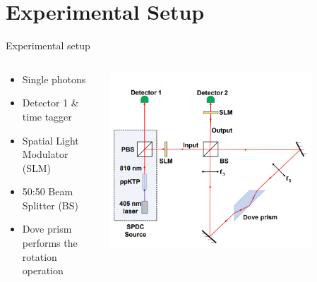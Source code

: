 \documentclass[aspectratio=169,9pt]{beamer}
\begin{document}
\section{Experimental Setup}
\begin{frame}[t]{Experimental setup}
  \begin{columns}[T]
    \begin{column}{0.4\textwidth}
      \begin{itemize}
        \item Single photons
        \item Detector 1 \& time tagger
        \item Spatial Light Modulator (SLM)
        \item 50:50 Beam Splitter (BS)
        \item Dove prism performs the rotation operation
      \end{itemize}
    \end{column}
    \begin{column}{0.6\textwidth}
      \includegraphics[width=0.8\textwidth]{experimental_setup.png}\\
    \end{column}
  \end{columns}
\end{frame}
\end{document}
